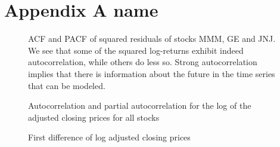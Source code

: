 \chapter{Appendix A name}\label{ch:appAlabel}





\begin{figure}[H]
    \centering
    \begin{adjustbox}{width=.95\textwidth,center}
    
    \end{adjustbox}
    \begin{adjustbox}{width=.95\textwidth,center}
    
    \end{adjustbox}  
    \begin{adjustbox}{width=.95\textwidth,center}
    
    \end{adjustbox}  
    \caption{ACF and PACF of squared residuals of stocks MMM, GE and JNJ. We see that some of the squared log-returns exhibit indeed autocorrelation, while others do less so. Strong autocorrelation implies that there is information about the future in the time series that can be modeled.}
    \label{fig:ACF_selected_squared_log_returns}
\end{figure}{}






\begin{figure}[h]
    \centering
    \begin{adjustbox}{width=.85\textwidth,center}
    
    \end{adjustbox}  
    \caption{Autocorrelation and partial autocorrelation for the log of the adjusted closing prices for all stocks}
    \label{fig:acf_pacf_log_adjclose}
\end{figure}{}


\begin{figure}[h]
    \centering
    \begin{adjustbox}{width=.9\textwidth,center}
    
    \end{adjustbox}  
    \caption{First difference of log adjusted closing prices}
    \label{fig:all_fd_log_adjclose}
\end{figure}{}


